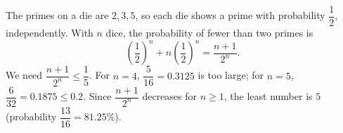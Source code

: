 The primes on a die are $2,3,5$, so each die shows a prime with probability $\dfrac{1}{2}$, independently. With $n$ dice, the probability of fewer than two primes is
\[
\left(\dfrac{1}{2}\right)^n+n\left(\dfrac{1}{2}\right)^n=\dfrac{n+1}{2^n}.
\]
We need $\dfrac{n+1}{2^n}\le\dfrac{1}{5}$. For $n=4$, $\dfrac{5}{16}=0.3125$ is too large; for $n=5$, $\dfrac{6}{32}=0.1875\le0.2$. Since $\dfrac{n+1}{2^n}$ decreases for $n\ge1$, the least number is $\boxed{5}$ (probability $\dfrac{13}{16}=81.25\%$).
